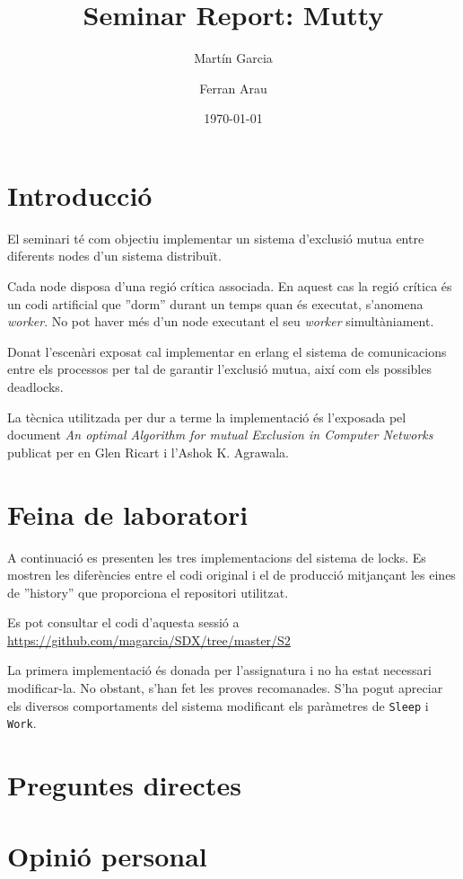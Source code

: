 \documentclass[a4paper, 11pt]{article}
\title{Seminar Report: Mutty}
\author{Martín Garcia \and Ferran Arau}
\date{\today{}}
\begin{document}
\maketitle

\section{Introducció}


El seminari té com objectiu implementar un sistema d'exclusió mutua entre diferents nodes d'un sistema distribuït. 

Cada node disposa d'una regió crítica associada. En aquest cas la regió crítica és un codi artificial que ''dorm'' durant un temps quan és executat, s'anomena \textit{worker}. No pot haver més d'un node executant el seu \textit{worker} simultàniament. 

Donat l'escenàri exposat cal implementar en erlang el sistema de comunicacions entre els processos per tal de garantir l'exclusió mutua, així com els possibles deadlocks. 

La tècnica utilitzada per dur a terme la implementació és l'exposada pel document \textit{An optimal Algorithm for mutual Exclusion in Computer Networks} publicat per en Glen Ricart i l’Ashok K. Agrawala.

\section{Feina de laboratori}

A continuació es presenten les tres implementacions del sistema de locks. Es
mostren les diferències entre el codi original i el de producció mitjançant les
eines de ''history'' que proporciona el repositori utilitzat. 

Es pot consultar el codi d'aquesta sessió a
\url{https://github.com/magarcia/SDX/tree/master/S2}

La primera implementació és donada per l'assignatura i no ha estat necessari modificar-la. No obstant, s'han fet les proves recomanades. S'ha pogut apreciar els diversos comportaments del sistema modificant els paràmetres de \texttt{Sleep} i \texttt{Work}.




\section{Preguntes directes}


\section{Opinió personal}
\end{document}
